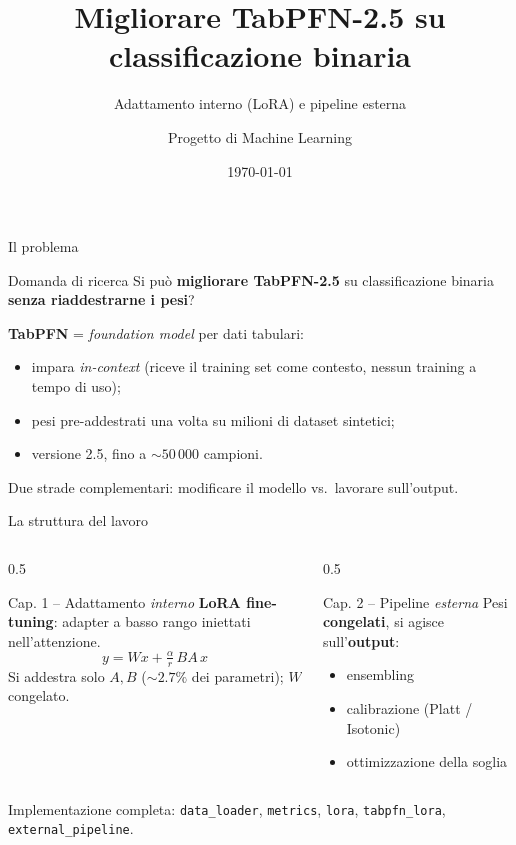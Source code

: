 \documentclass[11pt,aspectratio=169]{beamer}
\title[TabPFN + LoRA \& pipeline]{Migliorare TabPFN-2.5 su classificazione binaria}
\subtitle{Adattamento interno (LoRA) e pipeline esterna}
\author{Progetto di Machine Learning}
\date{\today}
\begin{document}
\frame{\titlepage}

\begin{frame}{Il problema}
\begin{block}{Domanda di ricerca}
Si può \textbf{migliorare TabPFN-2.5} su classificazione binaria
\textbf{senza riaddestrarne i pesi}?
\end{block}
\vfill
\textbf{TabPFN} = \emph{foundation model} per dati tabulari:
\begin{itemize}
  \item impara \emph{in-context} (riceve il training set come contesto, nessun
  training a tempo di uso);
  \item pesi pre-addestrati una volta su milioni di dataset sintetici;
  \item versione 2.5, fino a $\sim$$50\,000$ campioni.
\end{itemize}
\vfill
\centering
\alert{Due strade complementari: modificare il modello vs.\ lavorare sull'output.}
\end{frame}

\begin{frame}{La struttura del lavoro}
\begin{columns}[T]
\begin{column}{0.5\textwidth}
\begin{block}{Cap. 1 -- Adattamento \emph{interno}}
\textbf{LoRA fine-tuning}: adapter a basso rango iniettati nell'attenzione.
\[
 y = Wx + \tfrac{\alpha}{r}\,BA\,x
\]
Si addestra solo $A,B$ ($\sim$$2.7\%$ dei parametri); $W$ congelato.
\end{block}
\end{column}
\begin{column}{0.5\textwidth}
\begin{block}{Cap. 2 -- Pipeline \emph{esterna}}
Pesi \textbf{congelati}, si agisce sull'\textbf{output}:
\begin{itemize}
  \item ensembling
  \item calibrazione (Platt / Isotonic)
  \item ottimizzazione della soglia
\end{itemize}
\end{block}
\end{column}
\end{columns}
\vfill
\centering\small
Implementazione completa: \texttt{data\_loader}, \texttt{metrics},
\texttt{lora}, \texttt{tabpfn\_lora}, \texttt{external\_pipeline}.
\end{frame}
\end{document}
